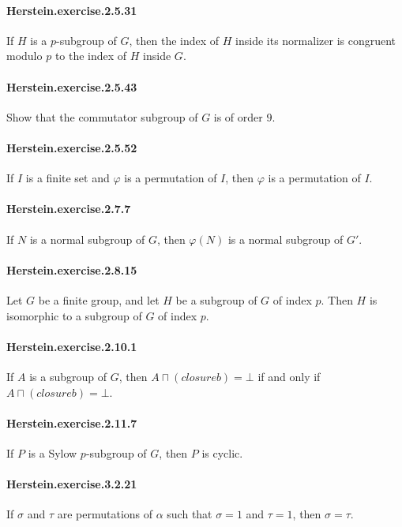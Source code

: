 \documentclass{article}
\begin{document}
\paragraph{Herstein.exercise.2.5.31} If $H$ is a $p$-subgroup of $G$, then the index of $H$ inside its normalizer is congruent modulo $p$ to the index of $H$ inside $G$.

\paragraph{Herstein.exercise.2.5.43} Show that the commutator subgroup of $G$ is of order $9$.

\paragraph{Herstein.exercise.2.5.52} If $I$ is a finite set and $φ$ is a permutation of $I$, then $φ$ is a permutation of $I$.

\paragraph{Herstein.exercise.2.7.7} If $N$ is a normal subgroup of $G$, then $φ(N)$ is a normal subgroup of $G'$. 

\paragraph{Herstein.exercise.2.8.15} Let $G$ be a finite group, and let $H$ be a subgroup of $G$ of index $p$. Then $H$ is isomorphic to a subgroup of $G$ of index $p$. 

\paragraph{Herstein.exercise.2.10.1} If $A$ is a subgroup of $G$, then $A ⊓ (closure {b}) = ⊥$ if and only if $A ⊓ (closure {b}) = ⊥$.

\paragraph{Herstein.exercise.2.11.7} If $P$ is a Sylow $p$-subgroup of $G$, then $P$ is cyclic.

\paragraph{Herstein.exercise.3.2.21} If $σ$ and $τ$ are permutations of $α$ such that $σ = 1$ and $τ = 1$, then $σ = τ$.
\end{document}
